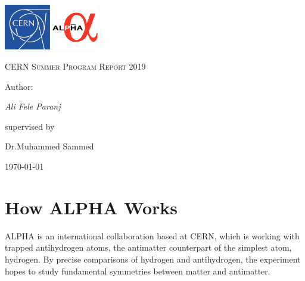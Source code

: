 \documentclass[12pt,a4paper]{article}
\begin{document}
\begin{titlepage}
	\centering
	\includegraphics[width=0.15\textwidth]{cern}\hspace{50mm}
\includegraphics[width=0.15\textwidth]{Alpha}	
	
	\par\vspace{1cm}
	{\scshape\LARGE CERN Summer Program Report 2019 \par}
	\vspace{1cm}
	
	\vspace{1.5cm}
	
	\vspace{2cm}
	\begin{Large}
	Author:
	\end{Large} \par
	{\Large\itshape Ali Fele Paranj \par}
	\vfill
	supervised by\par
	Dr.Muhammed Sammed

	\vfill

	{\large \today\par}
\end{titlepage}



\newpage

\tableofcontents

\newpage

\section{How ALPHA Works}

ALPHA is an international collaboration based at CERN, which is working with trapped antihydrogen atoms, the antimatter counterpart of the simplest atom, hydrogen. By precise comparisons of hydrogen and antihydrogen, the experiment hopes to study fundamental symmetries between matter and antimatter. 
\end{document}
